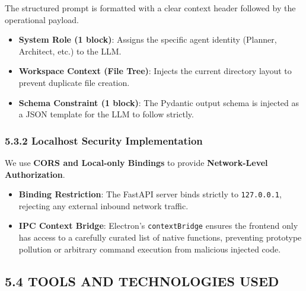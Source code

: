 \documentclass[
  12pt,
]{article}
\providecommand{\tightlist}{%
  \setlength{\itemsep}{0pt}\setlength{\parskip}{0pt}}
\begin{document}
The structured prompt is formatted with a clear context header followed
by the operational payload.

\begin{itemize}
\tightlist
\item
  \textbf{System Role (1 block)}: Assigns the specific agent identity
  (Planner, Architect, etc.) to the LLM.
\item
  \textbf{Workspace Context (File Tree)}: Injects the current directory
  layout to prevent duplicate file creation.
\item
  \textbf{Schema Constraint (1 block)}: The Pydantic output schema is
  injected as a JSON template for the LLM to follow strictly.
\end{itemize}

\subsubsection{5.3.2 Localhost Security
Implementation}\label{localhost-security-implementation}

We use \textbf{CORS and Local-only Bindings} to provide
\textbf{Network-Level Authorization}.

\begin{itemize}
\tightlist
\item
  \textbf{Binding Restriction}: The FastAPI server binds strictly to
  \texttt{127.0.0.1}, rejecting any external inbound network traffic.
\item
  \textbf{IPC Context Bridge}: Electron's \texttt{contextBridge} ensures
  the frontend only has access to a carefully curated list of native
  functions, preventing prototype pollution or arbitrary command
  execution from malicious injected code.
\end{itemize}

\subsection{5.4 TOOLS AND TECHNOLOGIES
USED}\label{tools-and-technologies-used}
\end{document}
